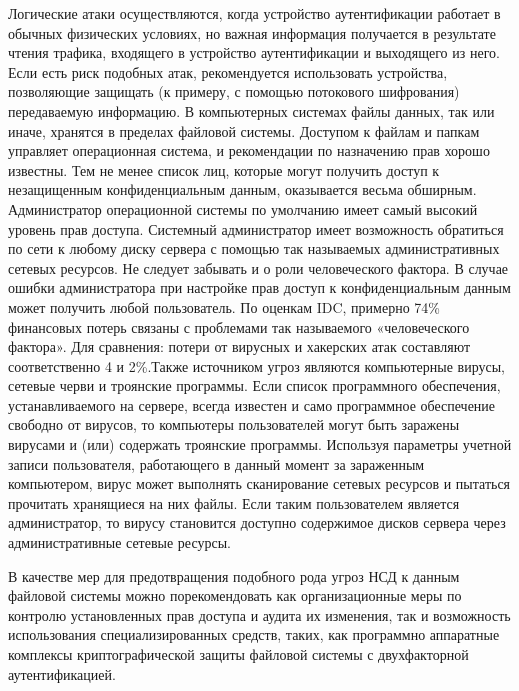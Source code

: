 Логические атаки осуществляются, когда устройство аутентификации работает в
обычных физических условиях, но важная информация получается в результате чтения
трафика, входящего в устройство аутентификации и выходящего из него. Если есть
риск подобных атак, рекомендуется использовать устройства, позволяющие защищать
(к примеру, с помощью потокового шифрования) передаваемую информацию. В
компьютерных системах файлы данных, так или иначе, хранятся в пределах файловой
системы. Доступом к файлам и папкам управляет операционная система, и
рекомендации по назначению прав хорошо известны. Тем не менее список лиц,
которые могут получить доступ к незащищенным конфиденциальным данным,
оказывается весьма обширным. Администратор операционной системы по умолчанию
имеет самый высокий уровень прав доступа. Системный администратор имеет
возможность обратиться по сети к любому диску сервера с помощью так называемых
административных сетевых ресурсов. Не следует забывать и о роли человеческого
фактора. В случае ошибки администратора при настройке прав доступ к
конфиденциальным данным может получить любой пользователь. По оценкам IDC,
примерно 74\% финансовых потерь связаны с проблемами так называемого
«человеческого фактора». Для сравнения: потери от вирусных и хакерских атак
составляют соответственно 4 и 2\%.Также источником угроз являются компьютерные
вирусы, сетевые черви и троянские программы. Если список программного
обеспечения, устанавливаемого на сервере, всегда известен и само программное
обеспечение свободно от вирусов, то компьютеры пользователей могут быть заражены
вирусами и (или) содержать троянские программы. Используя параметры учетной
записи пользователя, работающего в данный момент за зараженным компьютером,
вирус может выполнять сканирование сетевых ресурсов и пытаться прочитать
хранящиеся на них файлы. Если таким пользователем является администратор, то
вирусу становится доступно содержимое дисков сервера через административные
сетевые ресурсы.

В качестве мер для предотвращения подобного рода угроз НСД к данным файловой
системы можно порекомендовать как организационные меры по контролю установленных
прав доступа и аудита их изменения, так и возможность использования
специализированных средств, таких, как программно аппаратные комплексы
криптографической защиты файловой системы с двухфакторной аутентификацией.

